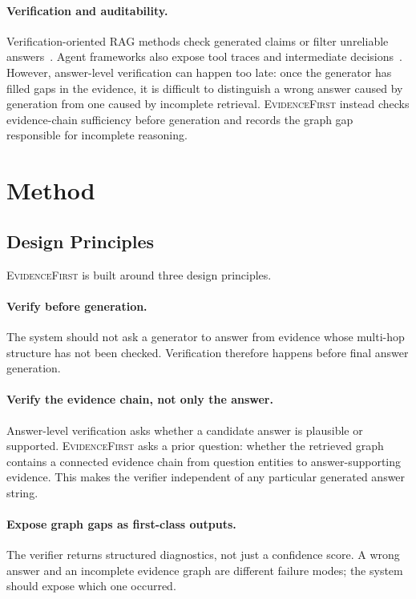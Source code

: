 \documentclass[runningheads]{llncs}
\newcommand{\sys}{\textsc{EvidenceFirst}\xspace}
\begin{document}
\paragraph{Verification and auditability.}
Verification-oriented RAG methods check generated claims or filter unreliable
answers~\cite{fairrag2025,huang2025unbiased}. Agent frameworks also expose
tool traces and intermediate decisions~\cite{wu2023autogen,hong2024metagpt}.
However, answer-level verification can happen too late: once the generator has
filled gaps in the evidence, it is difficult to distinguish a wrong answer
caused by generation from one caused by incomplete retrieval. \sys instead
checks evidence-chain sufficiency before generation and records the graph gap
responsible for incomplete reasoning.

\section{Method}
\label{sec:method}

\subsection{Design Principles}
\label{sec:principles}

\sys is built around three design principles.

\paragraph{Verify before generation.}
The system should not ask a generator to answer from evidence whose multi-hop
structure has not been checked. Verification therefore happens before final
answer generation.

\paragraph{Verify the evidence chain, not only the answer.}
Answer-level verification asks whether a candidate answer is plausible or
supported. \sys asks a prior question: whether the retrieved graph contains a
connected evidence chain from question entities to answer-supporting evidence.
This makes the verifier independent of any particular generated answer string.

\paragraph{Expose graph gaps as first-class outputs.}
The verifier returns structured diagnostics, not just a confidence score. A
wrong answer and an incomplete evidence graph are different failure modes; the
system should expose which one occurred.
\end{document}
